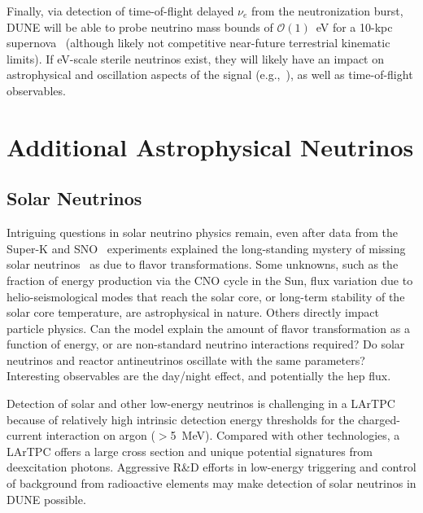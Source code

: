 Finally, via detection of time-of-flight delayed $\nu_e$ from the  neutronization burst,  DUNE will be able to probe neutrino mass bounds of $\mathcal{O}(1)$~eV for a 10-kpc supernova~\cite{Rossi-Torres:2015rla} (although likely not competitive near-future terrestrial kinematic limits).  If eV-scale sterile neutrinos exist, they will likely have an impact on astrophysical and oscillation aspects of the signal (e.g.,~\cite{Keranen:2007ga,Tamborra:2011is,Esmaili:2014gya}), as well as time-of-flight observables. \\





\section{Additional Astrophysical Neutrinos}
\label{sec:physics-snblowe-other}

\subsection{Solar Neutrinos}

Intriguing questions in solar neutrino physics remain,
even after data
from the Super-K and SNO~\cite{Fukuda:2001nj,Ahmad:2001an}
experiments explained the long-standing mystery of missing solar
neutrinos~\cite{Cleveland:1998nv} as due to flavor
transformations. 
Some unknowns, such as the fraction of energy production via the CNO
cycle in the Sun, flux variation due to helio-seismological modes that
reach the solar core, or long-term stability of the solar core
temperature, are astrophysical in nature. Others directly impact
particle physics. Can the  model explain the amount of flavor
transformation as a function of energy, or are non-standard neutrino
interactions required?  Do solar neutrinos and reactor antineutrinos
oscillate with the same parameters?   Interesting observables are the
day/night effect, and potentially the hep flux.

Detection of solar and other low-energy neutrinos is challenging in
a LArTPC because of relatively high intrinsic detection energy thresholds for
the charged-current interaction on argon ($>$\SI{5}{\MeV}). 
Compared with other technologies, a LArTPC offers a large
cross section and unique potential signatures from deexcitation
photons. Aggressive R\&D efforts in low-energy triggering and
control of background from radioactive elements may make detection
of solar neutrinos in DUNE possible.

